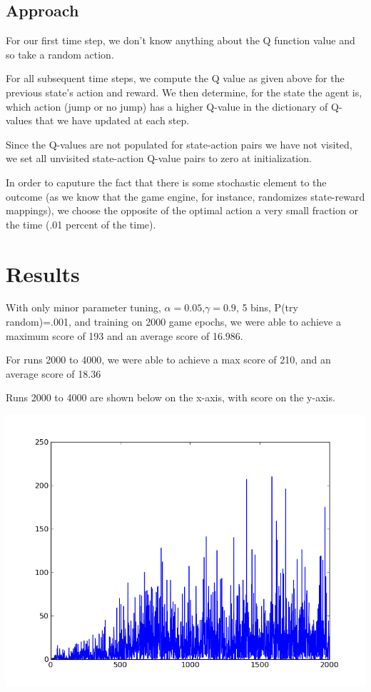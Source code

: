 \documentclass[11pt, oneside]{article}   	%
\begin{document}
\subsection*{Approach}

For our first time step, we don't know anything about the Q function value and so take a random action.

\newline
For all subsequent time steps, we compute the Q value as given above for the previous state's action and reward. We then determine, for the state the agent is, which action (jump or no jump) has a higher Q-value in the dictionary of Q-values that we have updated at each step.

\newline
Since the Q-values are not populated for state-action pairs we have not visited, we set all unvisited state-action Q-value pairs to zero at initialization.

\newline
In order to caputure the fact that there is some stochastic element to the outcome (as we know that the game engine, for instance, randomizes state-reward mappings), we choose the opposite of the optimal action a very small fraction or the time (.01 percent of the time).

\section*{Results}
\newline
With only minor parameter tuning, $\alpha = 0.05$,$\gamma = 0.9$, 5 bins, P(try random)=.001, and training on 2000 game epochs, we were able to achieve a maximum score of 193 and an average score of 16.986.

For runs 2000 to 4000, we were able to achieve a max score of 210, and an average score of 18.36
\newline

Runs 2000 to 4000 are shown below on the x-axis, with score on the y-axis.

\includegraphics[scale=.5]{graph2}
\end{document}
